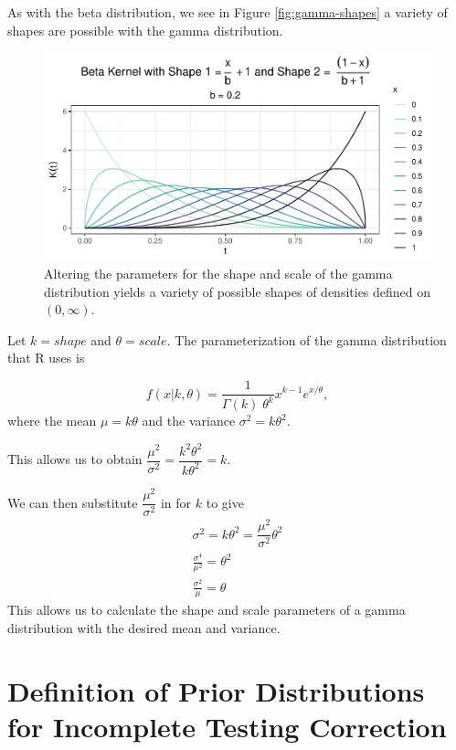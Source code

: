 \documentclass[12pt,twoside]{smiththesis}
\begin{document}
As with the beta distribution, we see in Figure \ref{fig:gamma-shapes} a variety of shapes are possible with the gamma distribution.
\begin{figure}

{\centering \includegraphics[width=0.9\linewidth]{thesis_files/figure-latex/unnamed-chunk-38-1} 

}

\caption{\label{fig:gamma-shapes}Altering the parameters for the shape and scale of the gamma distribution yields a variety of possible shapes of densities defined on $(0,\infty)$.}\label{fig:unnamed-chunk-38}
\end{figure}
Let \(k=shape\) and \(\theta=scale\). The parameterization of the gamma distribution that R uses is

\[f(x|k,\theta) = \frac{1}{\Gamma(k) \;\theta^k}x^{k-1} e^{x/\theta},\]
where the mean \(\mu =k\theta\) and the variance \(\sigma^2 = k\theta^2\).

This allows us to obtain \(\dfrac{\mu^2}{\sigma^2} = \dfrac{k^2 \theta^2}{k\theta^2} = k\).

We can then substitute \(\dfrac{\mu^2}{\sigma^2}\) in for \(k\) to give
\begin{align*}
\sigma^2 = k \theta^2 = \dfrac{\mu^2}{\sigma^2} \theta^2\\
\frac{\sigma^4}{\mu^2}=\theta^2\\
\frac{\sigma^2}{\mu}=\theta
\end{align*}
This allows us to calculate the shape and scale parameters of a gamma distribution with the desired mean and variance.

\hypertarget{definition-of-prior-distributions-for-incomplete-testing-correction}{%
\section{Definition of Prior Distributions for Incomplete Testing Correction}\label{definition-of-prior-distributions-for-incomplete-testing-correction}}
\end{document}
